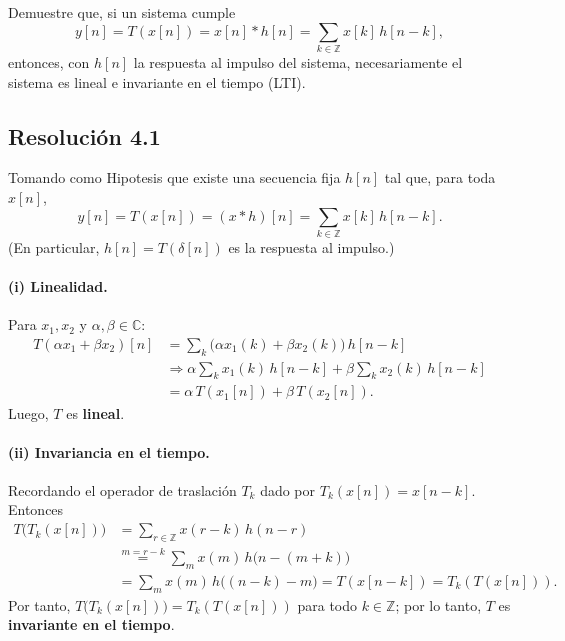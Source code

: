 \documentclass[
  11pt,
  letterpaper,
   addpoints,
   answers
  ]{exam}
\begin{document}
\begin{questions}
\question Demuestre que, si un sistema cumple
\[ y[n]=T(x[n])=x[n]*h[n]=\sum_{k\in\mathbb{Z}} x[k] \, h[n-k], \]
entonces, con \(h[n]\) la respuesta al impulso del sistema, necesariamente el sistema es lineal e invariante en el tiempo (LTI).


\begin{solution}
\subsection*{Resolución 4.1}
  Tomando como Hipotesis que existe una secuencia fija $h[n]$ tal que, para toda $x[n]$,
  \begin{equation}
y[n] = T(x[n])= (x*h)[n] =\sum_{k\in\mathbb Z} x[k]\,h[n-k].
\end{equation}
(En particular, $h[n]=T(\delta[n])$ es la respuesta al impulso.)

\paragraph{(i) Linealidad.}
Para $x_1,x_2$ y $\alpha,\beta\in\mathbb C$:
\begin{align}
T(\alpha x_1+\beta x_2)[n]
&= \sum_{k} \big(\alpha x_1(k)+\beta x_2(k)\big)\,h[n-k] \nonumber\\
&\Rightarrow \alpha \sum_{k} x_1(k)\,h[n-k]+\beta \sum_{k} x_2(k)\,h[n-k] \nonumber\\
&= \alpha\,T(x_1[n])+\beta\,T(x_2[n]).
\end{align}
Luego, $T$ es \textbf{lineal}.

\paragraph{(ii) Invariancia en el tiempo.}
Recordando el operador de traslación $T_k$ dado por $T_k(x[n])=x[n-k]$. Entonces
\begin{align}
T\big(T_k(x[n])\big)
&= \sum_{r \in \mathbb{Z}} x(r-k)\,h(n-r) \nonumber\\
&\overset{m=r-k}{=} \sum_{m} x(m)\,h\big(n-(m+k)\big) \nonumber\\
&= \sum_{m} x(m)\,h\big((n-k)-m\big)
 = T(x[n-k]) = T_k(T(x[n])).
\end{align}
Por tanto, $T\big(T_k(x[n])\big)=T_k(T(x[n]))$ para todo $k\in\mathbb Z$; por lo tanto, $T$ es \textbf{invariante en el tiempo}.

\end{solution}


\end{questions}
\end{document}
